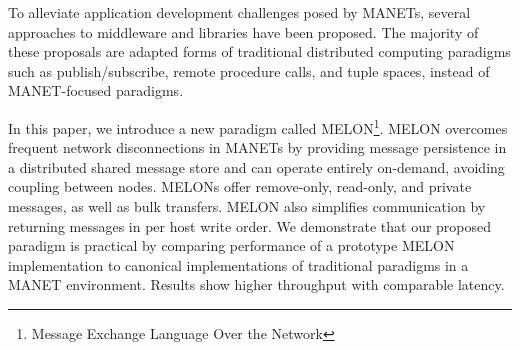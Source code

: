 \documentclass[lnicst]{svmultln}
\begin{document}
To alleviate application development challenges posed by MANETs, several approaches to middleware and libraries have been proposed. The majority of these proposals are adapted forms of traditional distributed computing paradigms such as publish/subscribe, remote procedure calls, and tuple spaces, instead of MANET-focused paradigms\cite{mine}.

In this paper, we introduce a new paradigm called MELON\footnote{Message Exchange Language Over the Network}. MELON overcomes frequent network disconnections in MANETs by providing message persistence in a distributed shared message store and can operate entirely on-demand, avoiding coupling between nodes. MELONs offer remove-only, read-only, and private messages, as well as bulk transfers. MELON also simplifies communication by returning messages in per host write order. We demonstrate that our proposed paradigm is practical by comparing performance of a prototype MELON implementation to canonical implementations of traditional paradigms in a MANET environment. Results show higher throughput with comparable latency.





\end{document}
